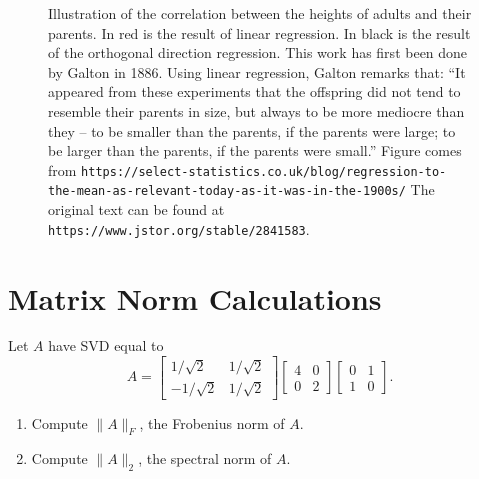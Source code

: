\documentclass[10pt]{article}
\begin{document}
\begin{figure}[ht]
\centering
\caption{Illustration of the correlation between the heights of adults and their parents. In red is the result of linear regression. In black is the result of the orthogonal direction regression. This work has first been done by Galton in 1886. Using linear regression, Galton remarks that: ``It appeared from these experiments that the offspring did not tend to resemble their parents in size, but always to be more mediocre than they -- to be smaller than the parents, if the parents were large; to be larger than the parents, if the parents were small.'' Figure comes from \texttt{https://select-statistics.co.uk/blog/regression-to-the-mean-as-relevant-today-as-it-was-in-the-1900s/} The original text can be found at \texttt{https://www.jstor.org/stable/2841583}.}
\label{fig:galton}
\end{figure}

\section{Matrix Norm Calculations}

Let $A$ have SVD equal to
\begin{equation}
A = \begin{bmatrix} 1/\sqrt{2} & 1/\sqrt{2} \\ -1/\sqrt{2} & 1/\sqrt{2} \end{bmatrix} \begin{bmatrix} 4 & 0 \\ 0 & 2 \end{bmatrix} \begin{bmatrix} 0 & 1 \\ 1 & 0 \end{bmatrix}.
\end{equation}

\begin{enumerate}[label=(\alph*)]
\item Compute $\|A\|_F$, the Frobenius norm of $A$.
\item Compute $\|A\|_2$, the spectral norm of $A$.
\end{enumerate}
\end{document}

